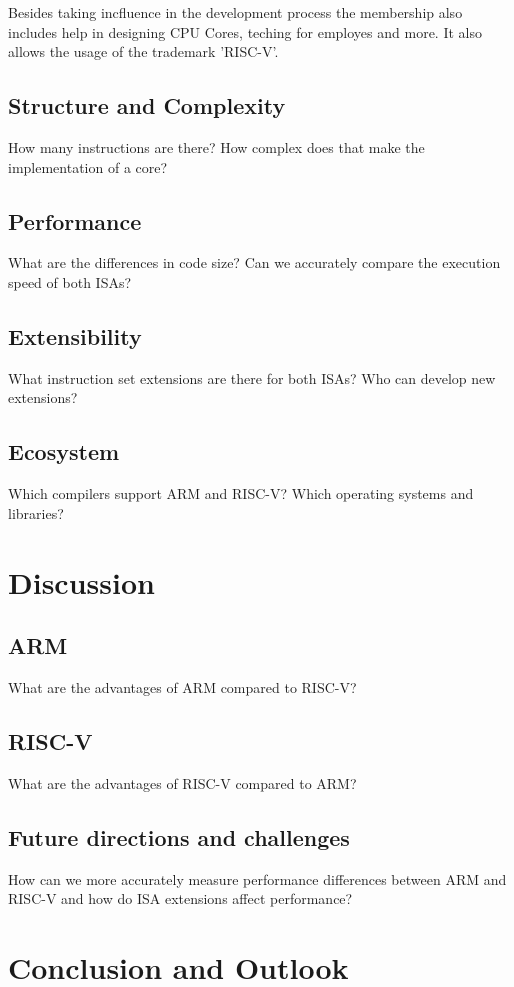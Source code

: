 \documentclass[conference]{IEEEtran}
\begin{document}
	Besides taking incfluence in the development process the membership also includes help in designing \gls{CPU} Cores, teching for employes and more. It also allows the usage of the trademark 'RISC-V'.


	\subsection{Structure and Complexity}
	How many instructions are there? How complex does that make the implementation of a core?
	\subsection{Performance}
	What are the differences in code size? Can we accurately compare the execution speed of both ISAs?
	\subsection{Extensibility}
	What instruction set extensions are there for both ISAs? Who can develop new extensions?
	\subsection{Ecosystem}
	Which compilers support ARM and RISC-V? Which operating systems and libraries?


\section{Discussion}
\label{ref:discussion}
	\subsection{ARM}
	What are the advantages of ARM compared to RISC-V?
	\subsection{RISC-V}
	What are the advantages of RISC-V compared to ARM?
	\subsection{Future directions and challenges}
	How can we more accurately measure performance differences between ARM and RISC-V and how do ISA extensions affect performance?

\section{Conclusion and Outlook}
\label{ref:conclusion}
\end{document}
